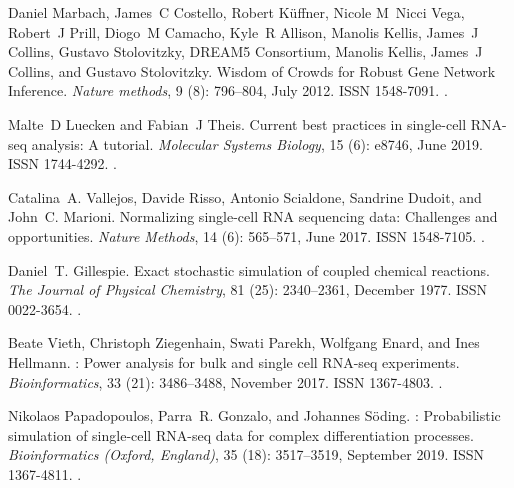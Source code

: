 \documentclass[10pt, a4paper]{article}
\begin{document}
\begin{thebibliography}{59}
	Daniel Marbach, James~C Costello, Robert K{\"u}ffner, Nicole M~Nicci Vega,
	Robert~J Prill, Diogo~M Camacho, Kyle~R Allison, Manolis Kellis, James~J
	Collins, Gustavo Stolovitzky, {DREAM5 Consortium}, Manolis Kellis, James~J
	Collins, and Gustavo Stolovitzky.
	\newblock Wisdom of {{Crowds}} for {{Robust Gene Network Inference}}.
	\newblock \emph{Nature methods}, 9 (8): 796--804, July 2012.
	\newblock ISSN 1548-7091.
	\newblock {}.
	
	Malte~D Luecken and Fabian~J Theis.
	\newblock Current best practices in single-cell {{RNA}}-seq analysis: A
	tutorial.
	\newblock \emph{Molecular Systems Biology}, 15 (6): e8746,
	June 2019.
	\newblock ISSN 1744-4292.
	\newblock {}.
	
	Catalina~A. Vallejos, Davide Risso, Antonio Scialdone, Sandrine Dudoit, and
	John~C. Marioni.
	\newblock Normalizing single-cell {{RNA}} sequencing data: Challenges and
	opportunities.
	\newblock \emph{Nature Methods}, 14 (6): 565--571, June 2017.
	\newblock ISSN 1548-7105.
	\newblock {}.
	
	Daniel~T. Gillespie.
	\newblock Exact stochastic simulation of coupled chemical reactions.
	\newblock \emph{The Journal of Physical Chemistry}, 81 (25):
	2340--2361, December 1977.
	\newblock ISSN 0022-3654.
	\newblock {}.
	
	Beate Vieth, Christoph Ziegenhain, Swati Parekh, Wolfgang Enard, and Ines
	Hellmann.
	: Power analysis for bulk and single cell {{RNA}}-seq
	experiments.
	\newblock \emph{Bioinformatics}, 33 (21): 3486--3488,
	November 2017.
	\newblock ISSN 1367-4803.
	\newblock {}.
	
	Nikolaos Papadopoulos, Parra~R. Gonzalo, and Johannes S{\"o}ding.
	: Probabilistic simulation of single-cell {{RNA}}-seq data
	for complex differentiation processes.
	\newblock \emph{Bioinformatics (Oxford, England)}, 35 (18):
	3517--3519, September 2019.
	\newblock ISSN 1367-4811.
	\newblock {}.
	

\end{thebibliography}
\end{document}
